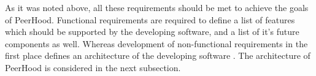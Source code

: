 %
As it was noted above, all these requirements should be met to achieve the goals of PeerHood. 
%
Functional requirements are required to define a list of features which should be supported by the developing software, and a list of it's future components as well. 
%
Whereas development of non-functional requirements in the first place defines an architecture of the developing software . 
%
The architecture of PeerHood is considered in the next subsection. 